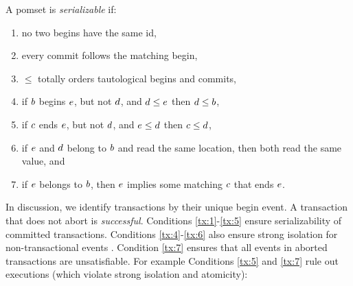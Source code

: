 \begin{definition}
  A pomset is \emph{serializable} if:
  \begin{enumerate}
  \item\label{tx:1} no two begins have the same id,
  \item\label{tx:2} every commit follows the matching begin,
  \item\label{tx:3} $\le$ totally orders tautological begins and commits,
  \item\label{tx:4} if $b$ begins $e$, but not $d$, and $d\le e$ then $d\le b$,
  \item\label{tx:5} if $c$ ends $e$, but not $d$, and $e\le d$ then $c\le d$,
  \item\label{tx:6} if $e$ and $d$ belong to $b$ and read the same
    location, then both read the same value, and 
  \item\label{tx:7} if $e$ belongs to $b$, then $e$ implies some
    matching $c$ that ends $e$.
  \end{enumerate}
\end{definition}
In discussion, we identify transactions by their unique begin event.  A
transaction that does not abort is \emph{successful}.
%
Conditions \ref{tx:1}-\ref{tx:5} ensure serializability of committed
transactions.  Conditions \ref{tx:4}-\ref{tx:6} also ensure strong isolation
for non-transactional events
\cite{DBLP:journals/pacmpl/DongolJR18}. Condition \ref{tx:7} ensures that all
events in aborted transactions are unsatisfiable.
%
For example Conditions \ref{tx:5} and \ref{tx:7} rule out
executions (which violate strong isolation and atomicity):
